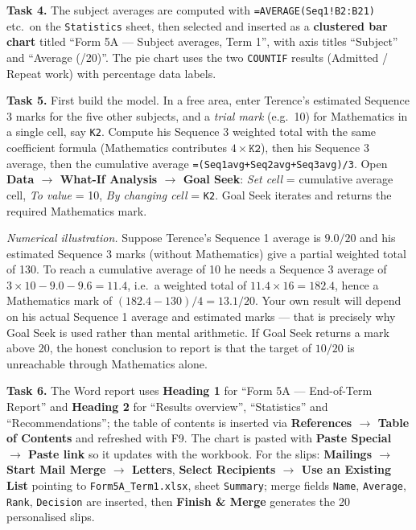 \documentclass[11pt]{article}
\begin{document}
\textbf{Task 4.} The subject averages are computed with \texttt{=AVERAGE(Seq1!B2:B21)} etc.\ on the \texttt{Statistics} sheet, then selected and inserted as a \textbf{clustered bar chart} titled ``Form 5A — Subject averages, Term 1'', with axis titles ``Subject'' and ``Average (/20)''. The pie chart uses the two \texttt{COUNTIF} results (Admitted / Repeat work) with percentage data labels.

\textbf{Task 5.} First build the model. In a free area, enter Terence's estimated Sequence 3 marks for the five other subjects, and a \emph{trial mark} (e.g.\ 10) for Mathematics in a single cell, say \texttt{K2}. Compute his Sequence 3 weighted total with the same coefficient formula (Mathematics contributes $4\times\texttt{K2}$), then his Sequence 3 average, then the cumulative average \texttt{=(Seq1avg+Seq2avg+Seq3avg)/3}. Open \textbf{Data $\rightarrow$ What-If Analysis $\rightarrow$ Goal Seek}: \emph{Set cell} = cumulative average cell, \emph{To value} = 10, \emph{By changing cell} = \texttt{K2}. Goal Seek iterates and returns the required Mathematics mark.

\emph{Numerical illustration.} Suppose Terence's Sequence 1 average is $9.0/20$ and his estimated Sequence 3 marks (without Mathematics) give a partial weighted total of 130. To reach a cumulative average of 10 he needs a Sequence 3 average of $3\times10-9.0-9.6 = 11.4$, i.e.\ a weighted total of $11.4\times16 = 182.4$, hence a Mathematics mark of $(182.4-130)/4 = 13.1/20$. Your own result will depend on his actual Sequence 1 average and estimated marks — that is precisely why Goal Seek is used rather than mental arithmetic. If Goal Seek returns a mark above 20, the honest conclusion to report is that the target of $10/20$ is unreachable through Mathematics alone.

\textbf{Task 6.} The Word report uses \textbf{Heading 1} for ``Form 5A — End-of-Term Report'' and \textbf{Heading 2} for ``Results overview'', ``Statistics'' and ``Recommendations''; the table of contents is inserted via \textbf{References $\rightarrow$ Table of Contents} and refreshed with F9. The chart is pasted with \textbf{Paste Special $\rightarrow$ Paste link} so it updates with the workbook. For the slips: \textbf{Mailings $\rightarrow$ Start Mail Merge $\rightarrow$ Letters}, \textbf{Select Recipients $\rightarrow$ Use an Existing List} pointing to \texttt{Form5A\_Term1.xlsx}, sheet \texttt{Summary}; merge fields \texttt{Name}, \texttt{Average}, \texttt{Rank}, \texttt{Decision} are inserted, then \textbf{Finish \& Merge} generates the 20 personalised slips.
\end{document}
